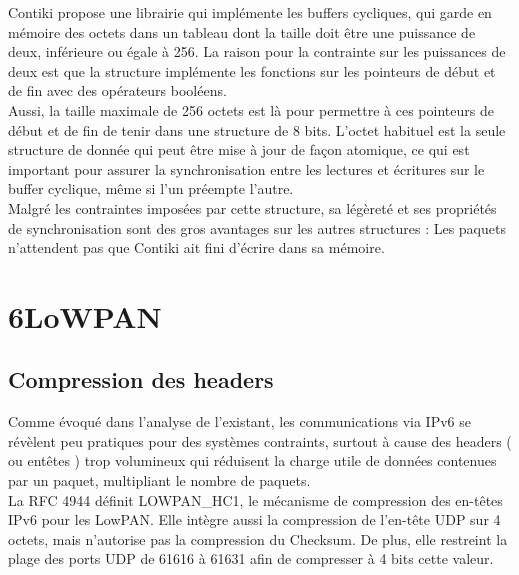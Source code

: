 				Contiki propose une librairie qui implémente les buffers cycliques, qui garde en mémoire des octets dans un tableau dont la taille doit être une puissance de deux, inférieure ou égale à 256. La raison pour la contrainte sur les puissances de deux est que la structure implémente les fonctions sur les pointeurs de début et de fin avec des opérateurs booléens.\\
				Aussi, la taille maximale de 256 octets est là pour permettre à ces pointeurs de début et de fin de tenir dans une structure de 8 bits. L'octet habituel est la seule structure de donnée qui peut être mise à jour de façon atomique, ce qui est important pour assurer la synchronisation entre les lectures et écritures sur le buffer cyclique, même si l'un préempte l'autre.\\
				
				Malgré les contraintes imposées par cette structure, sa légèreté et ses propriétés de synchronisation sont des gros avantages sur les autres structures : Les paquets n'attendent pas que Contiki ait fini d'écrire dans sa mémoire.
	
\section{6LoWPAN}
	\subsection{Compression des headers}
		Comme évoqué dans l'analyse de l'existant, les communications via IPv6 se révèlent peu pratiques pour des systèmes contraints, surtout à cause des headers ( ou entêtes ) trop volumineux qui réduisent la charge utile de données contenues par un paquet, multipliant le nombre de paquets. \\
		La RFC 4944 définit LOWPAN\_HC1, le mécanisme de compression des en-têtes IPv6 pour les LowPAN. Elle intègre aussi la compression de l'en-tête UDP sur 4 octets, mais n'autorise pas la compression du Checksum. De plus, elle restreint la plage des ports UDP de 61616 à 61631 afin de compresser à 4 bits cette valeur.
		
